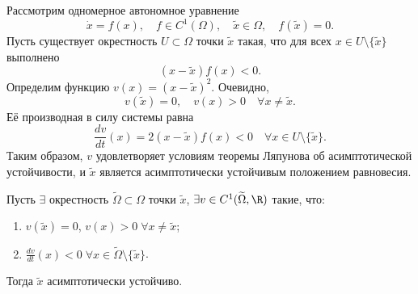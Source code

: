 \begin{example}
    Рассмотрим одномерное автономное уравнение
    \[
    \dot{x} = f(x), \quad f \in C^1(\Omega), \quad \tilde{x} \in \Omega, \quad f(\tilde{x}) = 0.
    \]
    Пусть существует окрестность \(U \subset \Omega\) точки \(\tilde{x}\) такая, что для всех \(x \in U \setminus \{\tilde{x}\}\) выполнено
    \[
    (x - \tilde{x}) f(x) < 0.
    \]
    Определим функцию \(v(x) = (x - \tilde{x})^2\). Очевидно,
    \[
    v(\tilde{x}) = 0, \quad v(x) > 0 \quad \forall x \neq \tilde{x}.
    \]
    Её производная в силу системы равна
    \[
    \frac{dv}{dt}(x) = 2(x - \tilde{x}) f(x) < 0 \quad \forall x \in U \setminus \{\tilde{x}\}.
    \]
    Таким образом, \(v\) удовлетворяет условиям теоремы Ляпунова об асимптотической устойчивости, и \(\tilde{x}\) является асимптотически устойчивым положением равновесия.
\end{example}

\begin{theorem}
    Пусть \(\exists\) окрестность \(\widetilde{\Omega} \subset \Omega\) точки \(\tilde{x}\), \(\exists v \in C^1(\widetilde{\Omega}, \R)\) такие, что:
    \begin{enumerate}
        \item \(v(\tilde{x}) = 0\), \(v(x) > 0 \; \forall x \ne \tilde{x}\);
        \item \(\displaystyle \frac{dv}{dt}(x) < 0 \; \forall x \in \widetilde{\Omega} \setminus \{\tilde{x}\}\).
    \end{enumerate}
    Тогда \(\tilde{x}\) асимптотически устойчиво.
\end{theorem}

